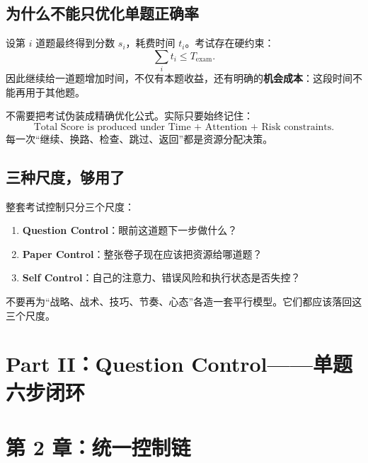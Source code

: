 \documentclass[11pt,a4paper]{ctexart}
\newcommand{\kw}[1]{\textbf{#1}}
\begin{document}
\subsection{为什么不能只优化单题正确率}
设第 $i$ 道题最终得到分数 $s_i$，耗费时间 $t_i$。考试存在硬约束：
\[
\sum_i t_i\le T_{\text{exam}}.
\]
因此继续给一道题增加时间，不仅有本题收益，还有明确的\kw{机会成本}：这段时间不能再用于其他题。

\begin{corebox}[考试的控制目标]
不需要把考试伪装成精确优化公式。实际只要始终记住：
\[
\boxed{
\text{Total Score}
\text{ is produced under }
\text{Time + Attention + Risk constraints.}
}
\]
每一次“继续、换路、检查、跳过、返回”都是资源分配决策。
\end{corebox}

\subsection{三种尺度，够用了}
整套考试控制只分三个尺度：
\begin{enumerate}
  \item \kw{Question Control}：眼前这道题下一步做什么？
  \item \kw{Paper Control}：整张卷子现在应该把资源给哪道题？
  \item \kw{Self Control}：自己的注意力、错误风险和执行状态是否失控？
\end{enumerate}
不要再为“战略、战术、技巧、节奏、心态”各造一套平行模型。它们都应该落回这三个尺度。

\newpage
\section{Part II：Question Control——单题六步闭环}

\section{第 2 章：统一控制链}
\end{document}

